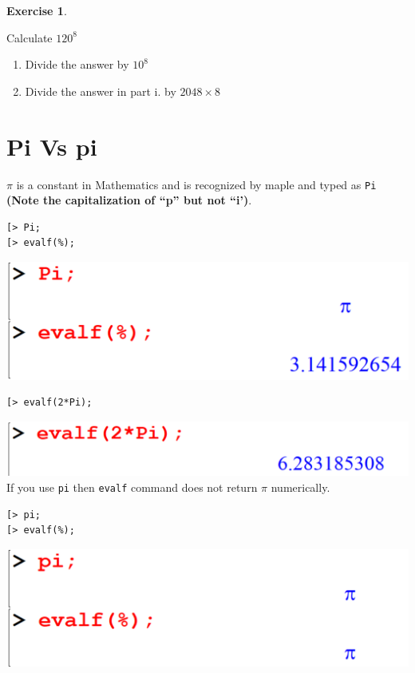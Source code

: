\documentclass[
]{book}
\providecommand{\tightlist}{%
  \setlength{\itemsep}{0pt}\setlength{\parskip}{0pt}}
\theoremstyle{definition}
\theoremstyle{definition}
\theoremstyle{definition}
\newtheorem{exercise}{Exercise}[chapter]
\theoremstyle{definition}
\theoremstyle{remark}
\begin{document}
\begin{exercise}
\protect\hypertarget{exr:unnamed-chunk-65}{}\label{exr:unnamed-chunk-65}

Calculate \(120^8\)

\begin{enumerate}
\def\labelenumi{\roman{enumi}.}
\tightlist
\item
  Divide the answer by \(10^8\)
\item
  Divide the answer in part i. by \(2048 \times 8\)
\end{enumerate}

\end{exercise}

\section{Pi Vs pi}\label{pi-vs-pi-1}

\(\pi\) is a constant in Mathematics and is recognized by maple and typed as \texttt{Pi} \textbf{(Note the capitalization of ``p'' but not ``i')}.

\begin{verbatim}
[> Pi;
[> evalf(%);
\end{verbatim}

\includegraphics{figures/Lesson 1/fig31.png}

\begin{verbatim}
[> evalf(2*Pi);
\end{verbatim}

\includegraphics{figures/Lesson 1/fig32.png}
If you use \texttt{pi} then \texttt{evalf} command does not return \(\pi\) numerically.

\begin{verbatim}
[> pi;
[> evalf(%);
\end{verbatim}

\includegraphics{figures/Lesson 1/fig33.png}
\end{document}

